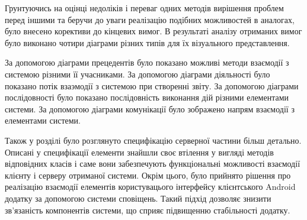 \documentclass[../main.tex]{subfiles}
\begin{document}
	Грунтуючись на оцінці недоліків і переваг одних методів вирішення проблем перед іншими та беручи до уваги реалізацію подібних можливостей в аналогах, було внесено корективи до кінцевих вимог. В результаті аналізу отриманих вимог було виконано чотири діаграми різних типів для їх візуального представлення.
	
	За допомогою діаграми прецедентів було показано можливі методи взаємодії з системою різними її учасниками. За допомогою діаграми діяльності було показано потік взаэмодії з системою при створенні звіту. За допомогою діаграми послідовності було показано послідовність виконання дій різними елементами системи. За допомогою діаграми комунікації було зображено напрям взаємодії з елементами системи.
	
	Також у розділі було розглянуто специфікацію серверної частини більш детально. Описані у специфікації елементи знайшли своє втілення у вигляді методів відповідних класів і саме вони забезпечують функціональні можливості взаємодії клієнту і серверу отриманої системи. Окрім цього, було прийнято рішення про реалізацію взаємодії елементів користувацього інтерфейсу клієнтського Android додатку за допомогою системи сповіщень. Такий підхід дозволяє знизити зв'язаність компонентів системи, що сприяє підвищенню стабільності додатку.
\end{document}
